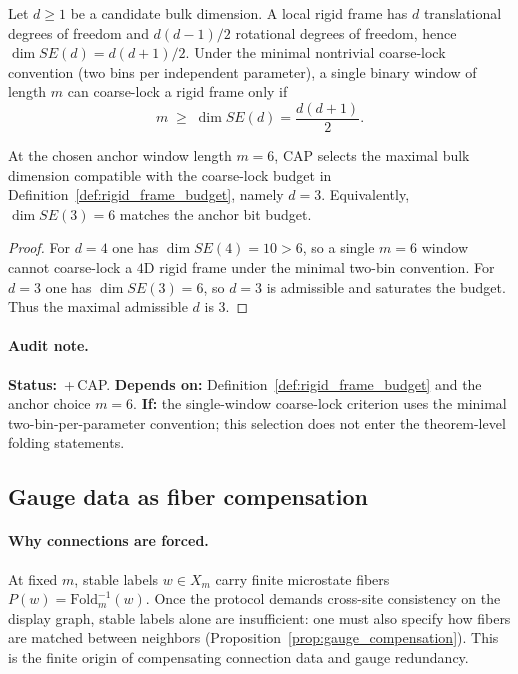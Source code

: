 \begin{definition}
\label{def:rigid_frame_budget}
Let $d\ge 1$ be a candidate bulk dimension.
A local rigid frame has $d$ translational degrees of freedom and $d(d-1)/2$ rotational degrees of freedom, hence $\dim SE(d)=d(d+1)/2$.
Under the minimal nontrivial coarse-lock convention (two bins per independent parameter), a single binary window of length $m$ can coarse-lock a rigid frame only if
\[
m\;\ge\;\dim SE(d)=\frac{d(d+1)}{2}.
\]
\end{definition}

\begin{proposition}\label{prop:bulk_dimension_from_anchor}
At the chosen anchor window length $m=6$, CAP selects the maximal bulk dimension compatible with the coarse-lock budget in Definition~\ref{def:rigid_frame_budget}, namely $d=3$.
Equivalently, $\dim SE(3)=6$ matches the anchor bit budget.
\end{proposition}
\begin{proof}
For $d=4$ one has $\dim SE(4)=10>6$, so a single $m=6$ window cannot coarse-lock a $4$D rigid frame under the minimal two-bin convention.
For $d=3$ one has $\dim SE(3)=6$, so $d=3$ is admissible and saturates the budget.
Thus the maximal admissible $d$ is $3$.
\end{proof}

\paragraph{Audit note.}
\AuditTag \textbf{Status:} \InterfaceTag\,+\,CAP.
\textbf{Depends on:} Definition~\ref{def:rigid_frame_budget} and the anchor choice $m=6$.
\textbf{If:} the single-window coarse-lock criterion uses the minimal two-bin-per-parameter convention; this selection does not enter the theorem-level folding statements.

\subsection{Gauge data as fiber compensation}
\label{subsec:tick_to_gauge}

\paragraph{Why connections are forced.}
At fixed $m$, stable labels $w\in X_m$ carry finite microstate fibers $P(w)=\mathrm{Fold}_m^{-1}(w)$.
Once the protocol demands cross-site consistency on the display graph, stable labels alone are insufficient: one must also specify how fibers are matched between neighbors (Proposition~\ref{prop:gauge_compensation}).
This is the finite origin of compensating connection data and gauge redundancy.

